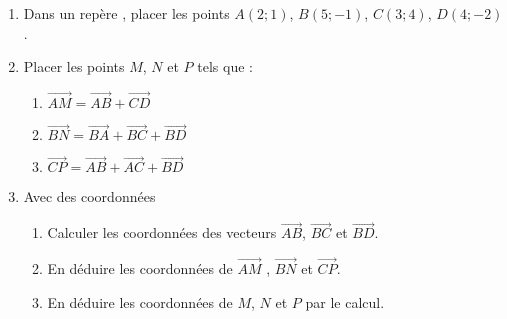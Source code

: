 
\begin{enumerate}
\item Dans un repère \Oij, placer les points $A(2;1)$, $B(5;-1)$, $C(3;4)$, $D(4;-2)$. 
\item Placer les points $M$, $N$ et $P$ tels que :
\begin{enumerate}
\item $\overrightarrow{AM}=\overrightarrow{AB}+\overrightarrow{CD}$
\item $\overrightarrow{BN}=\overrightarrow{BA}+\overrightarrow{BC}+\overrightarrow{BD}$
\item $\overrightarrow{CP}=\overrightarrow{AB}+\overrightarrow{AC}+\overrightarrow{BD}$
\end{enumerate}
\item Avec des coordonnées
\begin{enumerate}
\item Calculer les coordonnées des vecteurs $\overrightarrow{AB}$, $\overrightarrow{BC}$ et $\overrightarrow{BD}$. 
\item En déduire les coordonnées de $\overrightarrow{AM}$ , $\overrightarrow{BN}$ et $\overrightarrow{CP}$.
\item En déduire les coordonnées de $M$, $N$ et $P$ par le calcul.
\end{enumerate}

\end{enumerate}